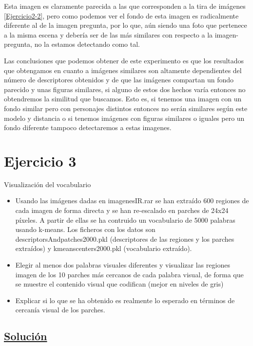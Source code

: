 \documentclass[12pt,a4paper]{article}
\begin{document}
Esta imagen es claramente parecida a las que corresponden a la tira de imágenes \ref{Ejercicio2-2}, pero como podemos ver el fondo de esta imagen es radicalmente diferente al de la imagen pregunta, por lo que, aún siendo una foto que pertenece a la misma escena y debería ser de las más similares con respecto a la imagen-pregunta, no la estamos detectando como tal.

\vspace{10px}

Las conclusiones que podemos obtener de este experimento es que los resultados que obtengamos en cuanto a imágenes similares son altamente dependientes del número de descriptores obtenidos y de que las imágenes compartan un fondo parecido y unas figuras similares, si alguno de estos dos hechos varía entonces no obtendremos la similitud que buscamos. Esto es, si tenemos una imagen con un fondo similar pero con personajes distintos entonces no serán similares según este modelo y distancia o si tenemos imágenes con figuras similares o iguales pero un fondo diferente tampoco detectaremos a estas imagenes.

\section{Ejercicio 3}
Visualización del vocabulario
\begin{itemize}
  \item Usando las imágenes dadas en imagenesIR.rar se han extraído 600 regiones de cada imagen de forma directa y se han re-escalado en parches de 24x24 píxeles. A partir de ellas se ha contruido un vocabulario de 5000 palabras usando k-means. Los ficheros con los datos son descriptorsAndpatches2000.pkl (descriptores de las regiones y los parches extraídos) y kmeanscenters2000.pkl  (vocabulario extraído).
  \item Elegir al menos dos palabras visuales diferentes y visualizar las regiones imagen de los 10 parches más cercanos de cada palabra visual, de forma que se muestre el contenido visual que codifican (mejor en niveles de gris)
  \item Explicar si lo que se ha obtenido es realmente lo esperado en términos de cercanía visual de los parches.
\end{itemize}

\subsection*{\underline{Solución}}
\end{document}
